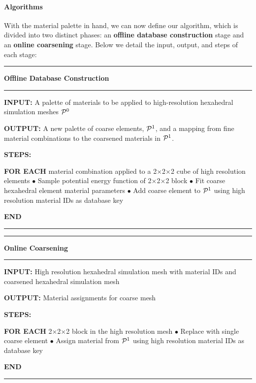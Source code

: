 \paragraph{Algorithms}
With the material palette in hand, we can now define our algorithm, which is divided into two distinct phases: an \textbf{offline database construction} stage and an \textbf{online coarsening} stage.  Below we detail the input, output, and steps of each stage:
\vspace{1mm}
\hrule
\textbf{Offline Database Construction}
\vspace{1mm}
\hrule
\begin{compactitem}
	\item \textbf{INPUT:} A palette of materials to be applied to high-resolution hexahedral simulation meshes $\mathcal{P}^0$
	\item \textbf{OUTPUT:} A new palette of coarse elements, $\mathcal{P}^1$, and a mapping from fine material combinations to the coarsened materials in $\mathcal{P}^1$. 
	\item \textbf{STEPS:}
	\item \textbf{FOR EACH} material combination applied to a 2$\times$2$\times$2 cube of high resolution elements
	\subitem $\bullet$ Sample potential energy function of 2$\times$2$\times$2 block
	\subitem $\bullet$ Fit coarse hexahedral element material parameters
	\subitem $\bullet$ Add coarse element to $\mathcal{P}^1$ using high resolution 
	\subitem material IDs as database key
	\item \textbf{END}
\end{compactitem}
\vspace{1mm}
\hrule
\vspace{1mm}
\hrule
\textbf{Online Coarsening}
\vspace{1mm}
\hrule
\begin{compactitem}
	\item \textbf{INPUT:} High resolution hexahedral simulation mesh with 
	\subitem material IDs and
	\subitem coarsened hexahedral simulation mesh 
	\item \textbf{OUTPUT:} Material assignments for coarse mesh
	\item \textbf{STEPS:}
	\item \textbf{FOR EACH} 2$\times$2$\times$2 block in the high resolution mesh
	\subitem $\bullet$ Replace with single coarse element
	\subitem $\bullet$ Assign material from $\mathcal{P}^1$ using high resolution 
	\subitem material IDs as database key
	\item \textbf{END}
\end{compactitem}
\vspace{1mm}
\hrule


